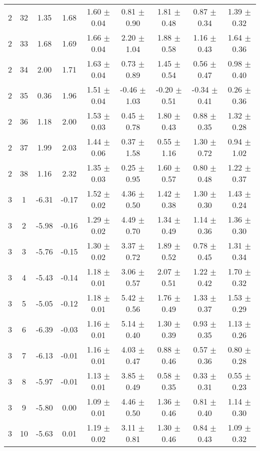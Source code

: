 \begin{landscape}
\begin{longtable}{ccccccccc}
   2 & 32 & 1.35 & 1.68 & 1.60 $\pm$ 0.04 & 0.81 $\pm$ 0.90 & 1.81 $\pm$ 0.48 & 0.87 $\pm$ 0.34 & 1.39 $\pm$ 0.32\\
   2 & 33 & 1.68 & 1.69 & 1.66 $\pm$ 0.04 & 2.20 $\pm$ 1.04 & 1.88 $\pm$ 0.58 & 1.16 $\pm$ 0.43 & 1.64 $\pm$ 0.36\\
   2 & 34 & 2.00 & 1.71 & 1.63 $\pm$ 0.04 & 0.73 $\pm$ 0.89 & 1.45 $\pm$ 0.54 & 0.56 $\pm$ 0.47 & 0.98 $\pm$ 0.40\\
   2 & 35 & 0.36 & 1.96 & 1.51 $\pm$ 0.04 & -0.46 $\pm$ 1.03 & -0.20 $\pm$ 0.51 & -0.34 $\pm$ 0.41 & 0.26 $\pm$ 0.36\\
   2 & 36 & 1.18 & 2.00 & 1.53 $\pm$ 0.03 & 0.45 $\pm$ 0.78 & 1.80 $\pm$ 0.43 & 0.88 $\pm$ 0.35 & 1.32 $\pm$ 0.28\\
   2 & 37 & 1.99 & 2.03 & 1.44 $\pm$ 0.06 & 0.37 $\pm$ 1.58 & 0.55 $\pm$ 1.16 & 1.30 $\pm$ 0.72 & 0.94 $\pm$ 1.02\\
   2 & 38 & 1.16 & 2.32 & 1.35 $\pm$ 0.03 & 0.25 $\pm$ 0.95 & 1.60 $\pm$ 0.57 & 0.80 $\pm$ 0.48 & 1.22 $\pm$ 0.37\\
 3 &  1 & -6.31 & -0.17 & 1.52 $\pm$ 0.02 & 4.36 $\pm$ 0.50 & 1.42 $\pm$ 0.38 & 1.30 $\pm$ 0.30 & 1.43 $\pm$ 0.24\\
 3 &  2 & -5.98 & -0.16 & 1.29 $\pm$ 0.02 & 4.49 $\pm$ 0.70 & 1.34 $\pm$ 0.49 & 1.14 $\pm$ 0.36 & 1.36 $\pm$ 0.30\\
   3 &  3 & -5.76 & -0.15 & 1.30 $\pm$ 0.02 & 3.37 $\pm$ 0.72 & 1.89 $\pm$ 0.52 & 0.78 $\pm$ 0.45 & 1.31 $\pm$ 0.34\\
   3 &  4 & -5.43 & -0.14 & 1.18 $\pm$ 0.01 & 3.06 $\pm$ 0.57 & 2.07 $\pm$ 0.51 & 1.22 $\pm$ 0.42 & 1.70 $\pm$ 0.32\\
   3 &  5 & -5.05 & -0.12 & 1.18 $\pm$ 0.01 & 5.42 $\pm$ 0.56 & 1.76 $\pm$ 0.49 & 1.33 $\pm$ 0.37 & 1.53 $\pm$ 0.29\\
   3 &  6 & -6.39 & -0.03 & 1.16 $\pm$ 0.01 & 5.14 $\pm$ 0.40 & 1.30 $\pm$ 0.39 & 0.93 $\pm$ 0.35 & 1.13 $\pm$ 0.26\\
   3 &  7 & -6.13 & -0.01 & 1.16 $\pm$ 0.01 & 4.03 $\pm$ 0.47 & 0.88 $\pm$ 0.46 & 0.57 $\pm$ 0.36 & 0.80 $\pm$ 0.28\\
   3 &  8 & -5.97 & -0.01 & 1.13 $\pm$ 0.01 & 3.85 $\pm$ 0.49 & 0.58 $\pm$ 0.35 & 0.33 $\pm$ 0.31 & 0.55 $\pm$ 0.23\\
   3 &  9 & -5.80 & 0.00 & 1.09 $\pm$ 0.01 & 4.46 $\pm$ 0.50 & 1.36 $\pm$ 0.46 & 0.81 $\pm$ 0.40 & 1.14 $\pm$ 0.30\\
   3 & 10 & -5.63 & 0.01 & 1.19 $\pm$ 0.02 & 3.11 $\pm$ 0.81 & 1.30 $\pm$ 0.46 & 0.84 $\pm$ 0.43 & 1.09 $\pm$ 0.32\\

\end{longtable}
\end{landscape}
